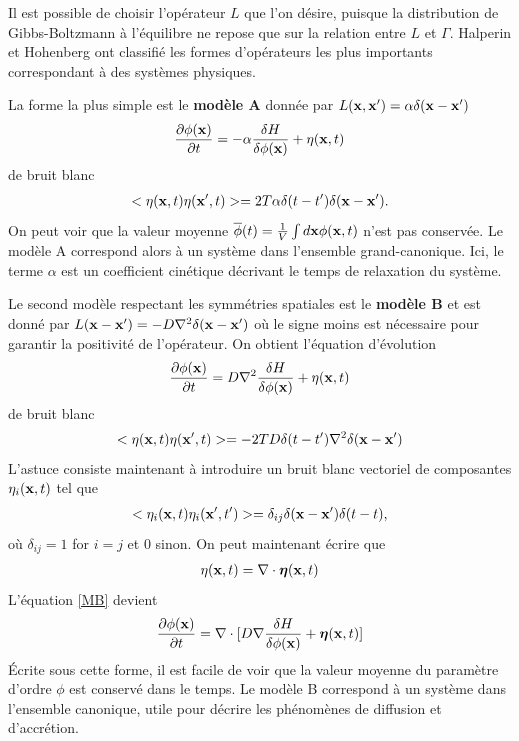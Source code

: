 Il est possible de choisir l'opérateur $L$ que l'on désire, puisque la distribution de Gibbs-Boltzmann à l'équilibre ne repose que sur la relation entre $L$ et $\Gamma$. Halperin et Hohenberg \cite{hohenberg_theory_1977} ont classifié les formes d'opérateurs les plus importants correspondant à des systèmes physiques.

La forme la plus simple est le \textbf{modèle A} donnée par $L({\bf x},{\bf x}')=\alpha\delta({\bf x}-{\bf x}')$ 
\begin{align}
    \frac{\partial \phi({\bf x})}{\partial t}= -\alpha \frac{\delta H}{\delta \phi({\bf x})} + \eta({\bf x},t)
    \label{MA}
\end{align}
de bruit blanc
\begin{align}
    < \eta({\bf x},t)\eta({\bf x}',t)> =2T \alpha \delta(t-t')\delta({\bf x}-{\bf x}').
\end{align}
On peut voir que la valeur moyenne $\overline \phi(t) = \frac{1}{V}\int d{\bf x} \phi({\bf x},t)$ n'est pas conservée. Le modèle A correspond alors à un système dans l'ensemble grand-canonique. Ici, le terme $\alpha$ est un coefficient cinétique décrivant le temps de relaxation du système. 

Le second modèle respectant les symmétries spatiales est le \textbf{modèle B} et est donné par $L({\bf x}-{\bf x}')= -D\nabla^2 \delta({\bf x}-{\bf x'})$ où le signe moins est nécessaire pour garantir la positivité de l'opérateur. On obtient l'équation d'évolution
\begin{align}
    \frac{\partial \phi({\bf x})}{\partial t}= D\nabla^2 \frac{\delta H}{\delta \phi({\bf x})} + \eta({\bf x},t)
    \label{MB}
\end{align}
de bruit blanc
\begin{align}
    <\eta({\bf x},t)\eta({\bf x}',t)> =-2TD   \delta(t-t')\nabla^2\delta({\bf x}-{\bf x}')
\end{align}
L'astuce consiste maintenant à introduire un bruit blanc vectoriel de composantes $\eta_i({\bf x},t)$ tel que 
\begin{align}
    < \eta_i({\bf x},t) \eta_i({\bf x}',t')> =\delta_{ij} \delta({\bf x}-{\bf x}')\delta(t-t),
\end{align}
où $\delta_{ij}=1$ for $i=j$ et $0$ sinon. On peut maintenant écrire que 
\begin{align}
    \eta({\bf x},t)= \nabla\cdot {\boldsymbol \eta}({\bf x},t)
\end{align}
L'équation \ref{MB} devient 
\begin{align}
    \frac{\partial \phi({\bf x})}{\partial t}= \nabla\cdot[ D\nabla \frac{\delta H}{\delta \phi({\bf x})} + {\boldsymbol\eta}({\bf x},t)]
\end{align}
Écrite sous cette forme, il est facile de voir que la valeur moyenne du paramètre d'ordre $\phi$ est conservé dans le temps. Le modèle B correspond à un système dans l'ensemble canonique, utile pour décrire les phénomènes de diffusion et d'accrétion.

